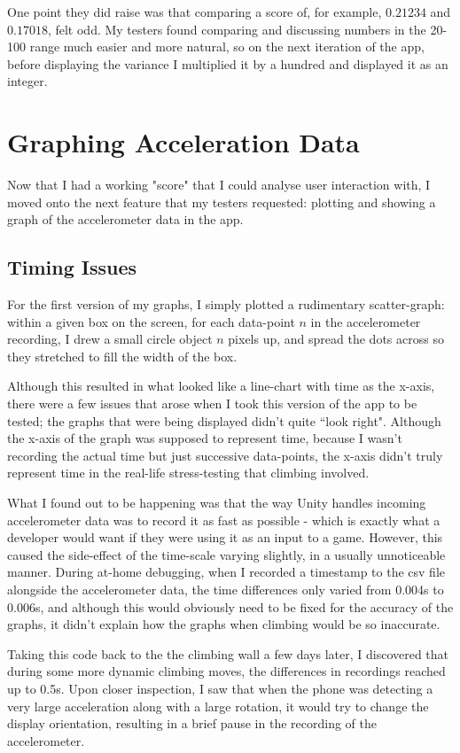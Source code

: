 One point they did raise was that comparing a score of, for example, $0.21234$ and $0.17018$, felt odd.
My testers found comparing and discussing numbers in the 20-100 range much easier and more natural, so on the next iteration of the app, before displaying the variance I multiplied it by a hundred and displayed it as an integer.


\section{Graphing Acceleration Data}
Now that I had a working "score" that I could analyse user interaction with, I moved onto the next feature that my testers requested: plotting and showing a graph of the accelerometer data in the app.

\subsection{Timing Issues}
For the first version of my graphs, I simply plotted a rudimentary scatter-graph:
within a given box on the screen, for each data-point $n$ in the accelerometer recording, I drew a small circle object $n$ pixels up, and spread the dots across so they stretched to fill the width of the box.

Although this resulted in what looked like a line-chart with time as the x-axis, there were a few issues that arose when I took this version of the app to be tested;
the graphs that were being displayed didn't quite ``look right".
Although the x-axis of the graph was supposed to represent time, because I wasn't recording the actual time but just successive data-points, the x-axis didn't truly represent time in the real-life stress-testing that climbing involved.

What I found out to be happening was that the way Unity handles incoming accelerometer data was to record it as fast as possible - which is exactly what a developer would want if they were using it as an input to a game.
However, this caused the side-effect of the time-scale varying slightly, in a usually unnoticeable manner.
During at-home debugging, when I recorded a timestamp to the csv file alongside the accelerometer data, the time differences only varied from 0.004s to 0.006s, and although this would obviously need to be fixed for the accuracy of the graphs, it didn't explain how the graphs when climbing would be so inaccurate.

Taking this code back to the the climbing wall a few days later, I discovered that during some more dynamic climbing moves, the differences in recordings reached up to 0.5s.
Upon closer inspection, I saw that when the phone was detecting a very large acceleration along with a large rotation, it would try to change the display orientation, resulting in a brief pause in the recording of the accelerometer.

